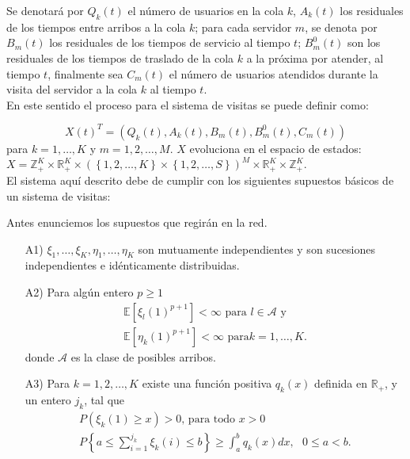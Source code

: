 \documentclass{article}
\newcommand{\ent}{\mathbb{Z}}
\newcommand{\rea}{\mathbb{R}}
\newcommand{\esp}{\mathbb{E}}
\begin{document}
Se denotar\'a por $Q_{k}\left(t\right)$ el n\'umero de usuarios en la cola $k$, $A_{k}\left(t\right)$ los residuales de los tiempos entre arribos a la cola $k$; para cada servidor $m$, se denota por $B_{m}\left(t\right)$ los residuales de los tiempos de servicio al tiempo $t$; $B_{m}^{0}\left(t\right)$ son los residuales de los tiempos de traslado de la cola $k$ a la pr\'oxima por atender, al tiempo $t$, finalmente sea $C_{m}\left(t\right)$ el n\'umero de usuarios atendidos durante la visita del servidor a la cola $k$ al tiempo $t$.\\

En este sentido el proceso para el sistema de visitas se puede definir como:

\begin{equation}\label{Esp.Edos.Down}
X\left(t\right)^{T}=\left(Q_{k}\left(t\right),A_{k}\left(t\right),B_{m}\left(t\right),B_{m}^{0}\left(t\right),C_{m}\left(t\right)\right)
\end{equation}
para $k=1,\ldots,K$ y $m=1,2,\ldots,M$. $X$ evoluciona en el espacio de estados: $X=\ent_{+}^{K}\times\rea_{+}^{K}\times\left(\left\{1,2,\ldots,K\right\}\times\left\{1,2,\ldots,S\right\}\right)^{M}\times\rea_{+}^{K}\times\ent_{+}^{K}$.\\

El sistema aqu\'i descrito debe de cumplir con los siguientes supuestos b\'asicos de un sistema de visitas:

Antes enunciemos los supuestos que regir\'an en la red.

\begin{itemize}
\item[A1)] $\xi_{1},\ldots,\xi_{K},\eta_{1},\ldots,\eta_{K}$ son mutuamente independientes y son sucesiones independientes e id\'enticamente distribuidas.

\item[A2)] Para alg\'un entero $p\geq1$
\begin{eqnarray*}
\esp\left[\xi_{l}\left(1\right)^{p+1}\right]<\infty\textrm{ para }l\in\mathcal{A}\textrm{ y }\\
\esp\left[\eta_{k}\left(1\right)^{p+1}\right]<\infty\textrm{ para
}k=1,\ldots,K.
\end{eqnarray*}
donde $\mathcal{A}$ es la clase de posibles arribos.

\item[A3)] Para $k=1,2,\ldots,K$ existe una funci\'on positiva $q_{k}\left(x\right)$ definida en $\rea_{+}$, y un entero $j_{k}$, tal que
\begin{eqnarray}
P\left(\xi_{k}\left(1\right)\geq x\right)>0\textrm{, para todo }x>0\\
P\left\{a\leq\sum_{i=1}^{j_{k}}\xi_{k}\left(i\right)\leq
b\right\}\geq\int_{a}^{b}q_{k}\left(x\right)dx, \textrm{ }0\leq
a<b.
\end{eqnarray}
\end{itemize}
\end{document}
